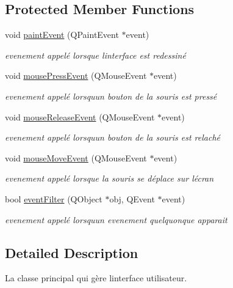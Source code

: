 \subsection*{Protected Member Functions}
\begin{DoxyCompactItemize}
\item 
void \mbox{\hyperlink{class_main_window_abf05d580e91f725777cdb6a5eb0bf08c}{paint\+Event}} (Q\+Paint\+Event $\ast$event)
\begin{DoxyCompactList}\small\item\em evenement appelé lorsque l\textquotesingle{}interface est redessiné \end{DoxyCompactList}\item 
void \mbox{\hyperlink{class_main_window_a2b5463ae209a03d1680b39c950dac8be}{mouse\+Press\+Event}} (Q\+Mouse\+Event $\ast$event)
\begin{DoxyCompactList}\small\item\em evenement appelé lorsqu\textquotesingle{}un bouton de la souris est pressé \end{DoxyCompactList}\item 
void \mbox{\hyperlink{class_main_window_a32bbb036a55856e49c31a5348f937b53}{mouse\+Release\+Event}} (Q\+Mouse\+Event $\ast$event)
\begin{DoxyCompactList}\small\item\em evenement appelé lorsqu\textquotesingle{}un bouton de la souris est relaché \end{DoxyCompactList}\item 
void \mbox{\hyperlink{class_main_window_a2cf42454562815dd44c716e78d515697}{mouse\+Move\+Event}} (Q\+Mouse\+Event $\ast$event)
\begin{DoxyCompactList}\small\item\em evenement appelé lorsque la souris se déplace sur l\textquotesingle{}écran \end{DoxyCompactList}\item 
bool \mbox{\hyperlink{class_main_window_aa0916a59a9d7ee37159ed0a2e0528960}{event\+Filter}} (Q\+Object $\ast$obj, Q\+Event $\ast$event)
\begin{DoxyCompactList}\small\item\em evenement appelé lorsqu\textquotesingle{}un evenement quelquonque apparait \end{DoxyCompactList}\end{DoxyCompactItemize}


\subsection{Detailed Description}
La classe principal qui gère l\textquotesingle{}interface utilisateur. 

